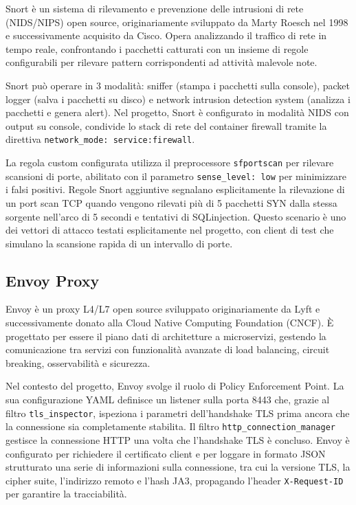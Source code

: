 Snort è un sistema di rilevamento e prevenzione delle intrusioni di rete (NIDS/NIPS) open source, originariamente sviluppato da Marty Roesch nel 1998 e successivamente acquisito da Cisco. Opera analizzando il traffico di rete in tempo reale, confrontando i pacchetti catturati con un insieme di regole configurabili per rilevare pattern corrispondenti ad attività malevole note.

Snort può operare in 3 modalità: sniffer (stampa i pacchetti sulla console), packet logger (salva i pacchetti su disco) e network intrusion detection system (analizza i pacchetti e genera alert). Nel progetto, Snort è configurato in modalità NIDS con output su console, condivide lo stack di rete del container firewall tramite la direttiva \texttt{network\_mode: service:firewall}.

La regola custom configurata utilizza il preprocessore \texttt{sfportscan} per rilevare scansioni di porte, abilitato con il parametro \texttt{sense\_level: low} per minimizzare i falsi positivi. Regole Snort aggiuntive segnalano esplicitamente la rilevazione di un port scan TCP quando vengono rilevati più di 5 pacchetti SYN dalla stessa sorgente nell'arco di 5 secondi e tentativi di SQLinjection. Questo scenario è uno dei vettori di attacco testati esplicitamente nel progetto, con client di test che simulano la scansione rapida di un intervallo di porte.

\subsection{Envoy Proxy}

Envoy è un proxy L4/L7 open source sviluppato originariamente da Lyft e successivamente donato alla Cloud Native Computing Foundation (CNCF). È progettato per essere il piano dati di architetture a microservizi, gestendo la comunicazione tra servizi con funzionalità avanzate di load balancing, circuit breaking, osservabilità e sicurezza.

Nel contesto del progetto, Envoy svolge il ruolo di Policy Enforcement Point. La sua configurazione YAML definisce un listener sulla porta 8443 che, grazie al filtro \texttt{tls\_inspector}, ispeziona i parametri dell'handshake TLS prima ancora che la connessione sia completamente stabilita. Il filtro \texttt{http\_connection\_manager} gestisce la connessione HTTP una volta che l'handshake TLS è concluso. Envoy è configurato per richiedere il certificato client e per loggare in formato JSON strutturato una serie di informazioni sulla connessione, tra cui la versione TLS, la cipher suite, l'indirizzo remoto e l'hash JA3, propagando l'header \texttt{X-Request-ID} per garantire la tracciabilità.

